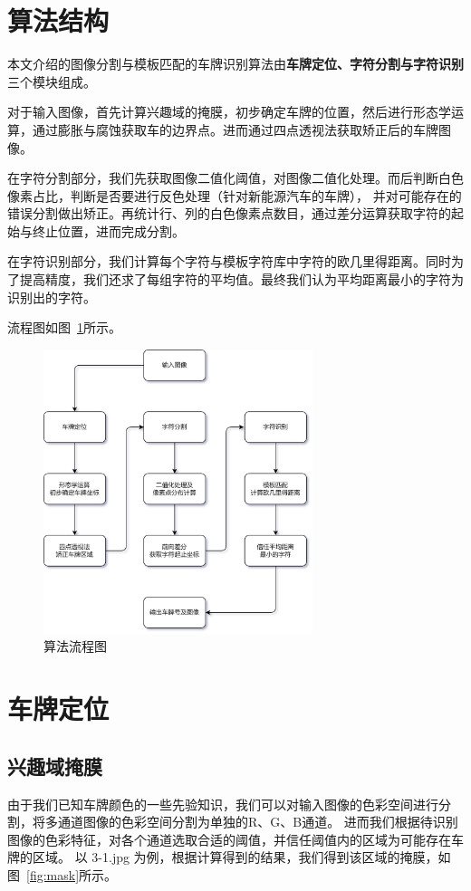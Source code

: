 \documentclass[utf8,a4paper]{ctexart}
\begin{document}
\section{算法结构}
本文介绍的图像分割与模板匹配的车牌识别算法由\textbf{车牌定位、字符分割与字符识别}三个模块组成。

对于输入图像，首先计算兴趣域的掩膜，初步确定车牌的位置，然后进行形态学运算，通过膨胀与腐蚀获取车的边界点。进而通过四点透视法获取矫正后的车牌图像。

在字符分割部分，我们先获取图像二值化阈值，对图像二值化处理。而后判断白色像素占比，判断是否要进行反色处理（针对新能源汽车的车牌），
并对可能存在的错误分割做出矫正。再统计行、列的白色像素点数目，通过差分运算获取字符的起始与终止位置，进而完成分割。

在字符识别部分，我们计算每个字符与模板字符库中字符的欧几里得距离。同时为了提高精度，我们还求了每组字符的平均值。最终我们认为平均距离最小的字符为识别出的字符。

流程图如图~\ref{fig:plate_recognition}所示。

\begin{figure}[h]
    \centering
    \includegraphics[width=0.7\textwidth]{./img/pic.png}
    \caption{算法流程图}
    \label{fig:plate_recognition}
\end{figure}

\section{车牌定位}
\subsection{兴趣域掩膜}
由于我们已知车牌颜色的一些先验知识，我们可以对输入图像的色彩空间进行分割，将多通道图像的色彩空间分割为单独的R、G、B通道。
进而我们根据待识别图像的色彩特征，对各个通道选取合适的阈值，并信任阈值内的区域为可能存在车牌的区域。
以 3-1.jpg 为例，根据计算得到的结果，我们得到该区域的掩膜，如图~\ref{fig:mask}所示。
\end{document}

